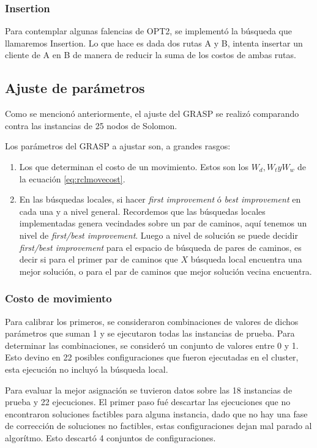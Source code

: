 \documentclass{article}
\begin{document}
  \subsubsection*{Insertion}

  Para contemplar algunas falencias de OPT2, se implementó la búsqueda que llamaremos Insertion. Lo que hace es dada dos rutas A y B, intenta insertar un cliente de A en B de manera de reducir la suma de los costos de ambas rutas.

  \subsection*{Ajuste de parámetros}

  Como se mencionó anteriormente, el ajuste del GRASP se realizó comparando contra las instancias de 25 nodos de Solomon.
  
  Los parámetros del GRASP a ajustar son, a grandes rasgos:

  \begin{enumerate}
    \item {Los que determinan el costo de un movimiento. Estos son los $W_d, W_t y W_w$ de la ecuación \ref{eq:rclmovecost}}.
    \item {En las búsquedas locales, si hacer {\it first improvement} ó {\it best improvement} en cada una y a nivel general. Recordemos que las búsquedas locales implementadas genera vecindades sobre un par de caminos, aquí tenemos un nivel de {\it first/best improvement}. Luego a nivel de solución se puede decidir {\it first/best improvement} para el espacio de búsqueda de pares de caminos, es decir si para el primer par de caminos que $X$ búsqueda local encuentra una mejor solución, o para el par de caminos que mejor solución vecina encuentra.}
  \end{enumerate}

  \subsubsection*{Costo de movimiento}

  Para calibrar los primeros, se consideraron combinaciones de valores de dichos parámetros que suman 1 y se ejecutaron todas las instancias de prueba. Para determinar las combinaciones, se consideró un conjunto de valores entre 0 y 1. Esto devino en 22 posibles configuraciones que fueron ejecutadas en el cluster, esta ejecución no incluyó la búsqueda local.

  Para evaluar la mejor asignación se tuvieron datos sobre las 18 instancias de prueba y 22 ejecuciones. El primer paso fué descartar las ejecuciones que no encontraron soluciones factibles para alguna instancia, dado que no hay una fase de corrección de soluciones no factibles, estas configuraciones dejan mal parado al algorítmo. Esto descartó 4 conjuntos de configuraciones.
\end{document}
